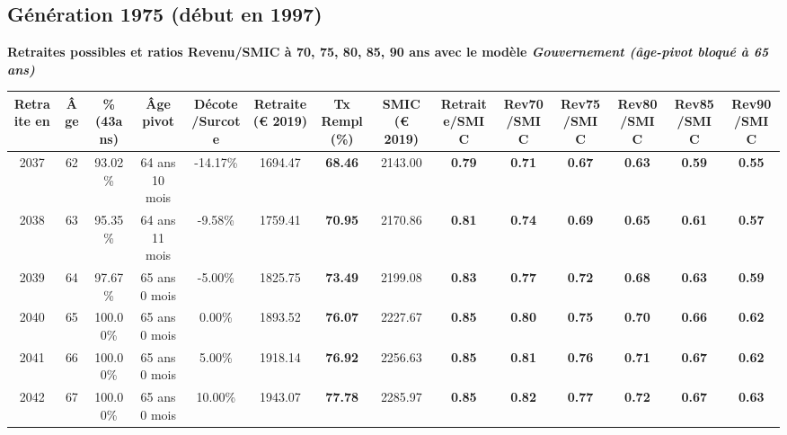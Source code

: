 \subsection{Génération 1975 (début en 1997)} 

{\bf \noindent Retraites possibles et ratios Revenu/SMIC à 70, 75, 80, 85, 90 ans avec le modèle \emph{Gouvernement (âge-pivot bloqué à 65 ans)}}  
 
\begin{adjustbox}{max width=\textwidth} 
\begin{tabular}[htb]{|c|c||c|c|c||c|c||c||c|c|c|c|c|c|} 
\hline 
 Retraite en &  Âge &  \%(43ans) &  Âge pivot &  Décote/Surcote &  Retraite (\euro{} 2019) &  Tx Rempl(\%) &  SMIC (\euro{} 2019) &  Retraite/SMIC &  Rev70/SMIC &  Rev75/SMIC &  Rev80/SMIC &  Rev85/SMIC &  Rev90/SMIC \\ 
\hline \hline 
 2037 &  62 &  93.02\% &  64 ans 10 mois &  -14.17\% &  1694.47 &  {\bf 68.46} &  2143.00 &  {\bf {\color{red} 0.79}} &  {\bf {\color{red} 0.71}} &  {\bf {\color{red} 0.67}} &  {\bf {\color{red} 0.63}} &  {\bf {\color{red} 0.59}} &  {\bf {\color{red} 0.55}} \\ 
\hline 
 2038 &  63 &  95.35\% &  64 ans 11 mois &  -9.58\% &  1759.41 &  {\bf 70.95} &  2170.86 &  {\bf {\color{red} 0.81}} &  {\bf {\color{red} 0.74}} &  {\bf {\color{red} 0.69}} &  {\bf {\color{red} 0.65}} &  {\bf {\color{red} 0.61}} &  {\bf {\color{red} 0.57}} \\ 
\hline 
 2039 &  64 &  97.67\% &  65 ans 0 mois &  -5.00\% &  1825.75 &  {\bf 73.49} &  2199.08 &  {\bf {\color{red} 0.83}} &  {\bf {\color{red} 0.77}} &  {\bf {\color{red} 0.72}} &  {\bf {\color{red} 0.68}} &  {\bf {\color{red} 0.63}} &  {\bf {\color{red} 0.59}} \\ 
\hline 
 2040 &  65 &  100.00\% &  65 ans 0 mois &  0.00\% &  1893.52 &  {\bf 76.07} &  2227.67 &  {\bf {\color{red} 0.85}} &  {\bf {\color{red} 0.80}} &  {\bf {\color{red} 0.75}} &  {\bf {\color{red} 0.70}} &  {\bf {\color{red} 0.66}} &  {\bf {\color{red} 0.62}} \\ 
\hline 
 2041 &  66 &  100.00\% &  65 ans 0 mois &  5.00\% &  1918.14 &  {\bf 76.92} &  2256.63 &  {\bf {\color{red} 0.85}} &  {\bf {\color{red} 0.81}} &  {\bf {\color{red} 0.76}} &  {\bf {\color{red} 0.71}} &  {\bf {\color{red} 0.67}} &  {\bf {\color{red} 0.62}} \\ 
\hline 
 2042 &  67 &  100.00\% &  65 ans 0 mois &  10.00\% &  1943.07 &  {\bf 77.78} &  2285.97 &  {\bf {\color{red} 0.85}} &  {\bf {\color{red} 0.82}} &  {\bf {\color{red} 0.77}} &  {\bf {\color{red} 0.72}} &  {\bf {\color{red} 0.67}} &  {\bf {\color{red} 0.63}} \\ 
\hline 
\hline 
\end{tabular} 
\end{adjustbox} 
 
